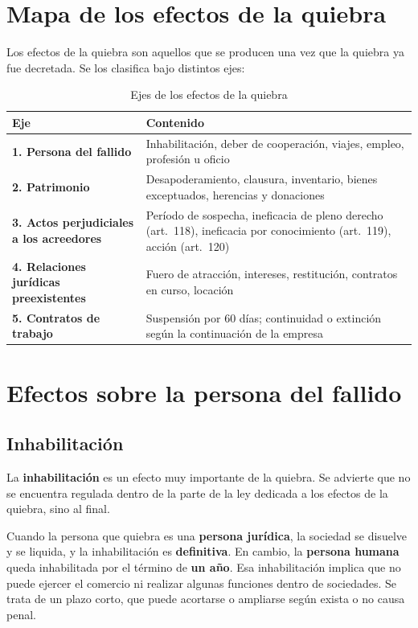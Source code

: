 \documentclass[12pt,oneside]{book}
\begin{document}
\section{Mapa de los efectos de la quiebra}

Los efectos de la quiebra son aquellos que se producen una vez que la quiebra ya fue decretada. Se los clasifica bajo distintos ejes:

\begin{table}[H]
\centering
\small
\caption{Ejes de los efectos de la quiebra}
\begin{tabularx}{\textwidth}{>{\raggedright\arraybackslash}p{} Y}
\toprule
\textbf{Eje} & \textbf{Contenido} \\
\midrule
\textbf{1. Persona del fallido} & Inhabilitación, deber de cooperación, viajes, empleo, profesión u oficio \\
\textbf{2. Patrimonio} & Desapoderamiento, clausura, inventario, bienes exceptuados, herencias y donaciones \\
\textbf{3. Actos perjudiciales a los acreedores} & Período de sospecha, ineficacia de pleno derecho (art.~118), ineficacia por conocimiento (art.~119), acción (art.~120) \\
\textbf{4. Relaciones jurídicas preexistentes} & Fuero de atracción, intereses, restitución, contratos en curso, locación \\
\textbf{5. Contratos de trabajo} & Suspensión por 60 días; continuidad o extinción según la continuación de la empresa \\
\bottomrule
\end{tabularx}
\end{table}

\section{Efectos sobre la persona del fallido}

\subsection{Inhabilitación}

La \textbf{inhabilitación} es un efecto muy importante de la quiebra. Se advierte que no se encuentra regulada dentro de la parte de la ley dedicada a los efectos de la quiebra, sino al final.

Cuando la persona que quiebra es una \textbf{persona jurídica}, la sociedad se disuelve y se liquida, y la inhabilitación es \textbf{definitiva}. En cambio, la \textbf{persona humana} queda inhabilitada por el término de \textbf{un año}. Esa inhabilitación implica que no puede ejercer el comercio ni realizar algunas funciones dentro de sociedades. Se trata de un plazo corto, que puede acortarse o ampliarse según exista o no causa penal.
\end{document}
